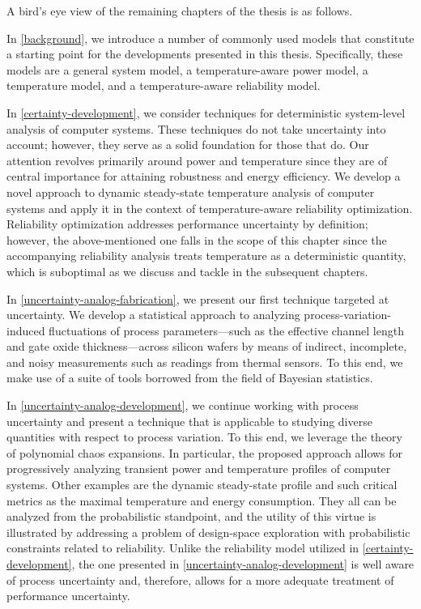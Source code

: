 A bird's eye view of the remaining chapters of the thesis is as follows.

In \cref{background}, we introduce a number of commonly used models that
constitute a starting point for the developments presented in this thesis.
Specifically, these models are a general system model, a temperature-aware power
model, a temperature model, and a temperature-aware reliability model.

In \cref{certainty-development}, we consider techniques for deterministic
system-level analysis of computer systems. These techniques do not take
uncertainty into account; however, they serve as a solid foundation for those
that do. Our attention revolves primarily around power and temperature since
they are of central importance for attaining robustness and energy efficiency.
We develop a novel approach to dynamic steady-state temperature analysis of
computer systems and apply it in the context of temperature-aware reliability
optimization. Reliability optimization addresses performance uncertainty by
definition; however, the above-mentioned one falls in the scope of this chapter
since the accompanying reliability analysis treats temperature as a
deterministic quantity, which is suboptimal as we discuss and tackle in the
subsequent chapters.

In \cref{uncertainty-analog-fabrication}, we present our first technique
targeted at uncertainty. We develop a statistical approach to analyzing
process-variation-induced fluctuations of process parameters---such as the
effective channel length and gate oxide thickness---across silicon wafers by
means of indirect, incomplete, and noisy measurements such as readings from
thermal sensors. To this end, we make use of a suite of tools borrowed from the
field of Bayesian statistics.

In \cref{uncertainty-analog-development}, we continue working with process
uncertainty and present a technique that is applicable to studying diverse
quantities with respect to process variation. To this end, we leverage the
theory of polynomial chaos expansions. In particular, the proposed approach
allows for progressively analyzing transient power and temperature profiles of
computer systems. Other examples are the dynamic steady-state profile and such
critical metrics as the maximal temperature and energy consumption. They all can
be analyzed from the probabilistic standpoint, and the utility of this virtue is
illustrated by addressing a problem of design-space exploration with
probabilistic constraints related to reliability. Unlike the reliability model
utilized in \cref{certainty-development}, the one presented in
\cref{uncertainty-analog-development} is well aware of process uncertainty and,
therefore, allows for a more adequate treatment of performance uncertainty.

